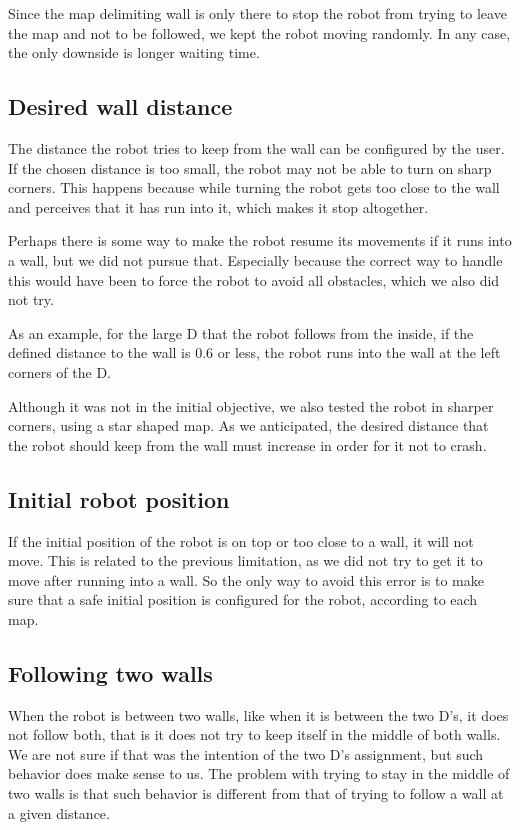\documentclass[10pt,journal,compsoc]{IEEEtran}
\begin{document}
Since the map delimiting wall is only there to stop the robot from trying to leave the map and not to be followed, we kept the robot moving randomly. In any case, the only downside is longer waiting time.

\subsection{Desired wall distance}

The distance the robot tries to keep from the wall can be configured by the user. If the chosen distance is too small, the robot may not be able to turn on sharp corners. This happens because while turning the robot gets too close to the wall and perceives that it has run into it, which makes it stop altogether.

Perhaps there is some way to make the robot resume its movements if it runs into a wall, but we did not pursue that. Especially because the correct way to handle this would have been to force the robot to avoid all obstacles, which we also did not try.

As an example, for the large D that the robot follows from the inside, if the defined distance to the wall is 0.6 or less, the robot runs into the wall at the left corners of the D.

Although it was not in the initial objective, we also tested the robot in sharper corners, using a star shaped map. As we anticipated, the desired distance that the robot should keep from the wall must increase in order for it not to crash.

\subsection{Initial robot position}

If the initial position of the robot is on top or too close to a wall, it will not move. This is related to the previous limitation, as we did not try to get it to move after running into a wall. So the only way to avoid this error is to make sure that a safe initial position is configured for the robot, according to each map.

\subsection{Following two walls}

When the robot is between two walls, like when it is between the two D's, it does not follow both, that is it does not try to keep itself in the middle of both walls. We are not sure if that was the intention of the two D's assignment, but such behavior does make sense to us. The problem with trying to stay in the middle of two walls is that such behavior is different from that of trying to follow a wall at a given distance. 
\end{document}
